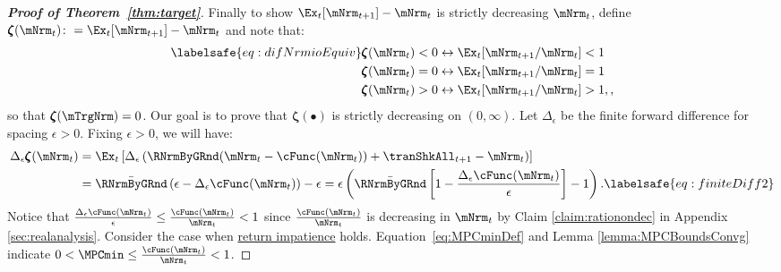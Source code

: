 \documentclass[\econtexRoot/BufferStockTheory]{subfiles}
\begin{document}
\begin{proof}[\textbf{Proof of Theorem~\ref{thm:target}}]
Finally to show $\Ex_t [{\mNrm}_{t+1}] -\mNrm_t$ is strictly decreasing $\mNrm_t$, define \providecommand{\difFunc}{\pmb{\zeta}} $\difFunc(\mNrm_t) \colon = 
\Ex_t[\mNrm_{t+1}] - \mNrm_t$ and note that:
%
\begin{equation}\begin{gathered}\begin{aligned}\labelsafe{eq:difNrmioEquiv}
  \difFunc(\mNrm_t) < 0 &\leftrightarrow \Ex_t[{\mNrm}_{t+1}/\mNrm_t] < 1 
                          \nonumber\\
  \difFunc(\mNrm_t) = 0 &\leftrightarrow \Ex_t[{\mNrm}_{t+1}/\mNrm_t] = 1\\
  \difFunc(\mNrm_t) > 0 &\leftrightarrow \Ex_t[{\mNrm}_{t+1}/\mNrm_t] > 
                          1,\nonumber,
\end{aligned}\end{gathered}\end{equation}
%
so that $\difFunc(\mTrgNrm)=0$.
Our goal is to prove that $\difFunc(\bullet)$ is strictly  decreasing on $(0,\infty)$.
Let $\Delta_{\epsilon}$ be the finite forward difference for spacing $\epsilon>0$.
Fixing $\epsilon>0$, we will have: 
%
\begin{equation}\begin{gathered}\begin{aligned}
  \Delta_{\epsilon}\difFunc(\mNrm_{t}) & 			= \Ex_{t}\left[\Delta_{\epsilon} \left( {\RNrmByGRnd}(\mNrm_{t}-\cFunc(\mNrm_{t}))+%
                                                                       {\tranShkAll}_{t+1} - {\mNrm}_t\right) \right] \notag \\
                                                  & =  \bar{\RNrmByGRnd}\left( \epsilon-
                                                       \Delta_{\epsilon}\cFunc({\mNrm}_t)\right) - \epsilon = \epsilon\left( \bar{\RNrmByGRnd}\left[1-
                                                       \frac{\Delta_{\epsilon}\cFunc({\mNrm}_t)}{\epsilon}\right]- 1\right). \labelsafe{eq:finiteDiff2}
\end{aligned}\end{gathered}\end{equation}
%
Notice  that $\frac{\Delta_{\epsilon}\cFunc({\mNrm}_t)}{\epsilon} \leq \frac{\cFunc(\mNrm_{t})}{\mNrm_{t}}<1$ since $\frac{\cFunc(\mNrm_{t})}{\mNrm_{t}}$ is decreasing in $\mNrm_{t}$ by Claim \ref{claim:rationondec} in Appendix \ref{sec:realanalysis}.
Consider the case when \hyperlink{RIC}{return impatience} holds.
Equation~\eqref{eq:MPCminDef} and Lemma \ref{lemma:MPCBoundsConvg} indicate $0 < \MPCmin \leq \frac{\cFunc(\mNrm_{t})}{\mNrm_{t}} < 1$.

\end{proof}
\end{document}
